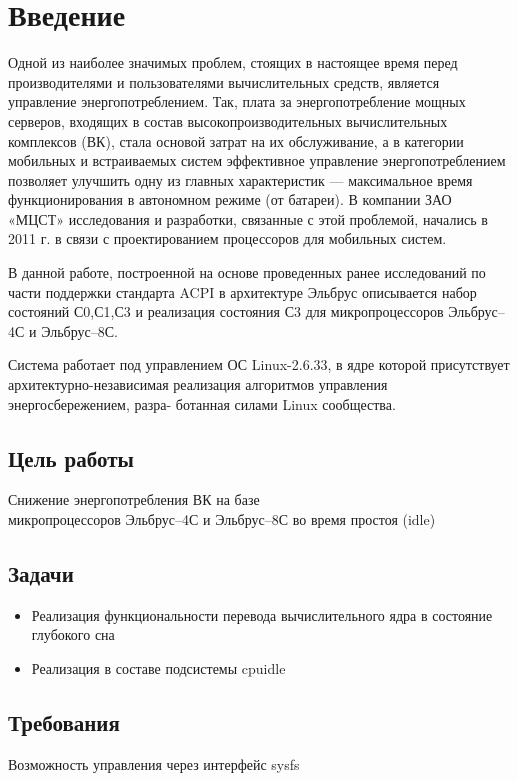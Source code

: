 \documentclass{article}
\begin{document}


\tableofcontents

\newpage

\section{Введение}

Одной из наиболее значимых проблем, стоящих в настоящее время перед производителями и пользователями вычислительных средств, является управление энергопотреблением. Так, плата за энергопотребление мощных серверов, входящих в состав высокопроизводительных вычислительных комплексов (ВК), стала основой затрат на их обслуживание, а в категории мобильных и встраиваемых систем эффективное управление энергопотреблением позволяет улучшить одну из главных характеристик --- максимальное время функционирования в автономном режиме (от батареи). В компании ЗАО «МЦСТ» исследования и разработки, связанные с этой проблемой, начались в 2011 г. в связи с проектированием процессоров для мобильных систем.

В данной работе, построенной на основе проведенных ранее исследований по части
поддержки стандарта ACPI в архитектуре Эльбрус описывается набор состояний С0,С1,С3 и реализация состояния С3 для микропроцессоров Эльбрус--4С и Эльбрус--8С.

Система работает под управлением ОС Linux-2.6.33, в ядре которой присутствует
архитектурно-независимая реализация алгоритмов управления энергосбережением, разра-
ботанная силами Linux сообщества. 

\subsection{Цель работы}
Снижение энергопотребления ВК на базе \\ микропроцессоров Эльбрус--4С и Эльбрус--8С во время простоя (idle)
\subsection{Задачи}
\begin{itemize}
\item Реализация функциональности перевода вычислительного ядра в состояние глубокого сна
\item Реализация в составе подсистемы cpuidle
\end{itemize}
\subsection{Требования}
Возможность управления через интерфейс sysfs
\end{document}
